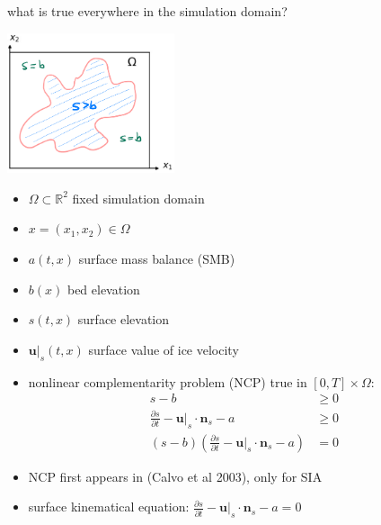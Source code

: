\documentclass[10pt,dvipsnames]{beamer}
\newcommand{\bn}{\mathbf{n}}
\newcommand{\bu}{\mathbf{u}}
\newcommand{\RR}{\mathbb{R}}
\begin{document}
\begin{frame}{what is true everywhere in the simulation domain?}

\hfill \includegraphics[width=0.37\textwidth]{mapplane}

\vspace{-37mm}

\begin{minipage}[t]{60mm}
\begin{itemize}
\item $\Omega \subset \RR^2$ fixed simulation domain
\item $x = (x_1,x_2) \in \Omega$
\item $a(t,x)$ surface mass balance (SMB)
\item $b(x)$ bed elevation
\item $s(t,x)$ surface elevation
\item $\bu|_s(t,x)$ surface value of ice velocity
\end{itemize}
\end{minipage}


\begin{itemize}
\item nonlinear complementarity problem (NCP) true in $[0,T] \times \Omega$:
\begin{align*}
s - b &\ge 0 \\
\frac{\partial s}{\partial t} - \bu|_s \cdot \bn_s - a &\ge 0 \\
(s - b) \left(\frac{\partial s}{\partial t} - \bu|_s \cdot \bn_s - a\right) &= 0
\end{align*}

\smallskip

\item {\footnotesize NCP first appears in (Calvo et al 2003), only for SIA}
\item {\footnotesize surface kinematical equation: $\frac{\partial s}{\partial t} - \bu|_s \cdot \bn_s - a = 0$}
\end{itemize}
\end{frame}
\end{document}
